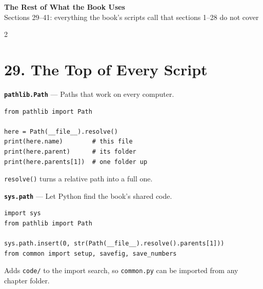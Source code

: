 \documentclass[10pt,a4paper]{article}
\begin{document}

\newpage

\begin{center}
    {\Large\bfseries\color{navy}
    The Rest of What the Book Uses}\\[2pt]
    {\small Sections 29--41: everything the book's scripts call that sections 1--28 do not cover}
\end{center}

\begin{multicols}{2}
\raggedcolumns

\section*{29. The Top of Every Script}

\begin{card}
\textbf{\texttt{pathlib.Path}} --- Paths that work on every computer.

\begin{lstlisting}[style=pythonstyle]
from pathlib import Path

here = Path(__file__).resolve()
print(here.name)        # this file
print(here.parent)      # its folder
print(here.parents[1])  # one folder up
\end{lstlisting}

\texttt{resolve()} turns a relative path into a full one.
\end{card}

\begin{card}
\textbf{\texttt{sys.path}} --- Let Python find the book's shared code.

\begin{lstlisting}[style=pythonstyle]
import sys
from pathlib import Path

sys.path.insert(0, str(Path(__file__).resolve().parents[1]))
from common import setup, savefig, save_numbers
\end{lstlisting}

Adds \texttt{code/} to the import search, so \texttt{common.py} can be
imported from any chapter folder.
\end{card}


\end{multicols}
\end{document}
